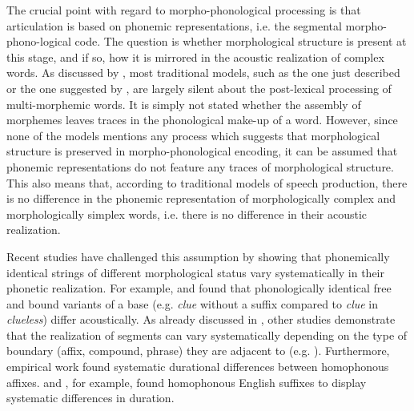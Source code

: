 {%
The crucial point with regard to morpho-phonological processing is that articulation is based on phonemic representations, i.e. the segmental morpho-phono-logical code. The question is whether morphological structure is present at this stage, and if so, how it is mirrored in the acoustic realization of complex words.
 As discussed by \citet[1037]{CohenGoldberg.2013}, most traditional models, such as the one just described or the one suggested by \cite{Dell.1986}, are largely silent about the post-lexical processing of multi-morphemic words. It is simply not stated whether the assembly of morphemes leaves traces in the phonological make-up of a word. However, since none of the models mentions any process which suggests that morphological structure is preserved in morpho-phonological encoding, it can be assumed that phonemic representations do not feature any traces of morphological structure. This also means that, according to traditional models of speech production, there is no difference in the phonemic representation of morphologically complex and morphologically simplex words, i.e. there is no difference in their acoustic realization.

Recent studies have challenged this assumption by showing that phonemically identical strings of different morphological status vary systematically in their phonetic realization. For example, \cite{Kemps.2005} and \citet{Blazej.2015} found that phonologically identical free and bound variants of a base (e.g. \textit{clue} without a suffix compared to \textit{clue} in \textit{clueless}) differ acoustically.
As already discussed in , other studies demonstrate that the realization of segments can vary systematically depending on the type of boundary (affix, compound, phrase) they are adjacent to  (e.g. \citealt{Sproat.1993b, Smith.2012,LeeKim.2013}). Furthermore, empirical work found systematic durational differences between homophonous affixes. \cite{Plag.2017} and \cite{Godfrey.2016}, for example, found homophonous English suffixes to display systematic differences in duration.
 
}
